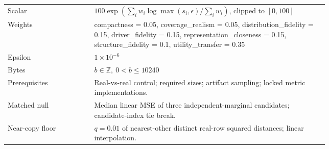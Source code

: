 \begin{tabular}{@{}l>{\raggedright\arraybackslash}p{0.73\linewidth}@{}}
\toprule
Scalar & $100\exp(\sum_i w_i\log\max(s_i,\epsilon)/\sum_i w_i)$, clipped to $[0,100]$ \\
Weights & compactness = 0.05, coverage\_realism = 0.05, distribution\_fidelity = 0.15, driver\_fidelity = 0.15, representation\_closeness = 0.15, structure\_fidelity = 0.1, utility\_transfer = 0.35 \\
Epsilon & $1\times 10^{-6}$ \\
Bytes & $b\in\mathbb{Z},\ 0<b\le 10240$ \\
Prerequisites & Real-vs-real control; required sizes; artifact sampling; locked metric implementations. \\
Matched null & Median linear MSE of three independent-marginal candidates; candidate-index tie break. \\
Near-copy floor & $q=0.01$ of nearest-other distinct real-row squared distances; linear interpolation. \\
\bottomrule
\end{tabular}
